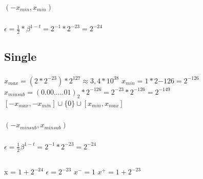 \documentclass{article}
\begin{document}
    \subsubsection{}
    $(-x_{min},x_{min})$\newline
    
    \subsubsection{}
    $\epsilon=\frac{1}{2}*\beta^{1-t}=2^{-1}*2^{-23}=2^{-24}$
    
    \subsection*{Single}
    \setcounter{subsubsection}{0}
    \subsubsection{}
    $x_{max}=(2*2^{-23})*2^{127}\approx3,4*10^{38}$\newline
    $x_{min}=1*2{-126}=2^{-126}$\newline
    $x_{minsub}=(0.00.....01)_{2}*2^{-126}=2^{-23}*2^{-126}=2^{-149}$\newline
    $[-x_{max},-x_{min}]\cup\{0\}\cup[x_{min},x_{max}]$\newline
    
    \subsubsection{}
    $(-x_{minsub},x_{minsub})$\newline

    \subsubsection{}
    $\epsilon=\frac{1}{2}\beta^{1-t}=2^{-1}*2^{-23}=2^{-24}$\newline

    \subsection{}
    \subsubsection{}
    x = $1+2^{-24}$\newline
    $\epsilon = 2^{-23}$\newline
    $x^{-} = 1$\newline
    $x^{+} = 1 + 2^{-23}$\newline
    
\end{document}
